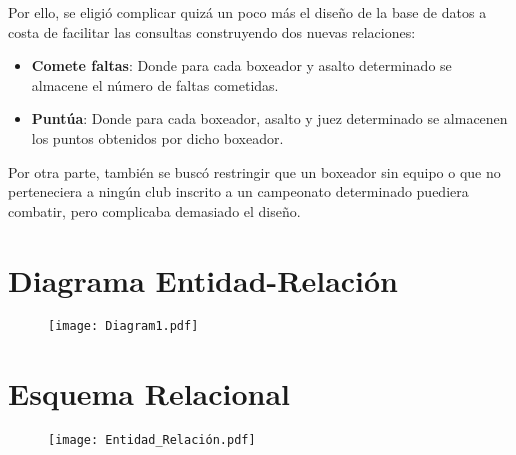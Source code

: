 \documentclass{article}
\begin{document}
\smallskip
Por ello, se eligió complicar quizá un poco más el diseño de la base de datos a costa de facilitar las consultas construyendo dos
nuevas relaciones:
\begin{itemize}
	\item \textbf{Comete faltas}: Donde para cada boxeador y asalto determinado se almacene el número de faltas cometidas.
	\item \textbf{Puntúa}: Donde para cada boxeador, asalto y juez determinado se almacenen los puntos obtenidos por dicho boxeador.
\end{itemize}

\smallskip
Por otra parte, también se buscó restringir que un boxeador sin equipo o que no perteneciera a ningún club inscrito a un campeonato
determinado puediera combatir, pero complicaba demasiado el diseño.

\bigskip\bigskip\bigskip\bigskip\bigskip
\section{Diagrama Entidad-Relación}
\bigskip\bigskip\bigskip
\begin{figure}[h!]
	\texttt{[image: Diagram1.pdf]}
\end{figure}

\newpage
\section{Esquema Relacional}
\begin{figure}[h!]
	\texttt{[image: Entidad\_Relación.pdf]}
\end{figure}
\end{document}
